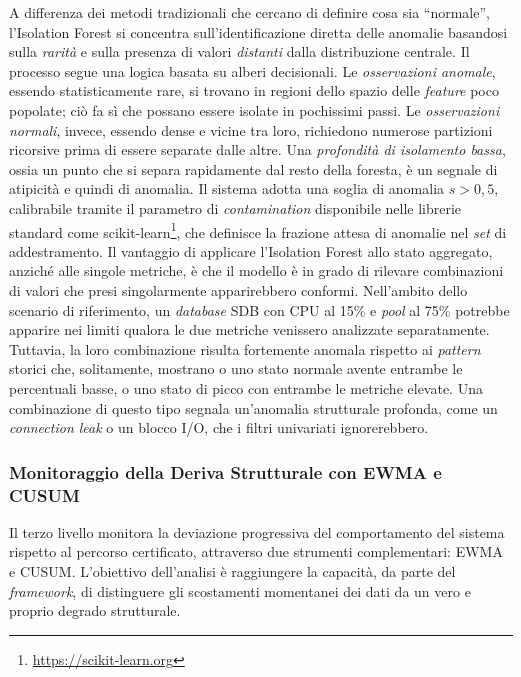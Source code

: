 A differenza dei metodi tradizionali che cercano di definire cosa sia ``normale'', l'Isolation
Forest si concentra sull'identificazione diretta delle anomalie basandosi sulla \emph{rarità} e
sulla presenza di valori \emph{distanti} dalla distribuzione centrale. Il processo segue una
logica basata su alberi decisionali. Le \textit{osservazioni anomale}, essendo statisticamente rare,
si trovano in regioni dello spazio delle \textit{feature} poco popolate; ciò fa sì che possano
essere isolate in pochissimi passi. Le \textit{osservazioni normali}, invece, essendo dense e vicine
tra loro, richiedono numerose partizioni ricorsive prima di essere separate dalle altre. Una
\emph{profondità di isolamento bassa}, ossia un punto che si separa rapidamente dal resto della
foresta, è un segnale di atipicità e quindi di anomalia. Il sistema adotta una soglia di anomalia
$s > 0{,}5$, calibrabile tramite il parametro di \textit{contamination} disponibile nelle librerie
standard come scikit-learn\footnote{\url{https://scikit-learn.org}}, che definisce la frazione
attesa di anomalie nel \textit{set} di addestramento. Il vantaggio di applicare l'Isolation Forest
allo stato aggregato, anziché alle singole metriche, è che il modello è in grado di rilevare
combinazioni di valori che presi singolarmente apparirebbero conformi. Nell'ambito dello scenario
di riferimento, un \textit{database} SDB con \gls{CPU} al 15\% e \textit{pool} al 75\% potrebbe
apparire nei limiti qualora le due metriche venissero analizzate separatamente. Tuttavia, la loro
combinazione risulta fortemente anomala rispetto ai \textit{pattern} storici che, solitamente,
mostrano o uno stato normale avente entrambe le percentuali basse, o uno stato di picco con
entrambe le metriche elevate. Una combinazione di questo tipo segnala un'anomalia strutturale
profonda, come un \textit{connection leak} o un blocco I/O, che i filtri univariati ignorerebbero.

\subsubsection{Monitoraggio della Deriva Strutturale con EWMA e \gls{CUSUM}}
\label{sec:ewma_cusum}

Il terzo livello monitora la deviazione progressiva del comportamento del sistema rispetto al
percorso certificato, attraverso due strumenti complementari: \gls{EWMA} e \gls{CUSUM}.
L'obiettivo dell'analisi è raggiungere la capacità, da parte del \textit{framework}, di distinguere
gli scostamenti momentanei dei dati da un vero e proprio degrado strutturale.

